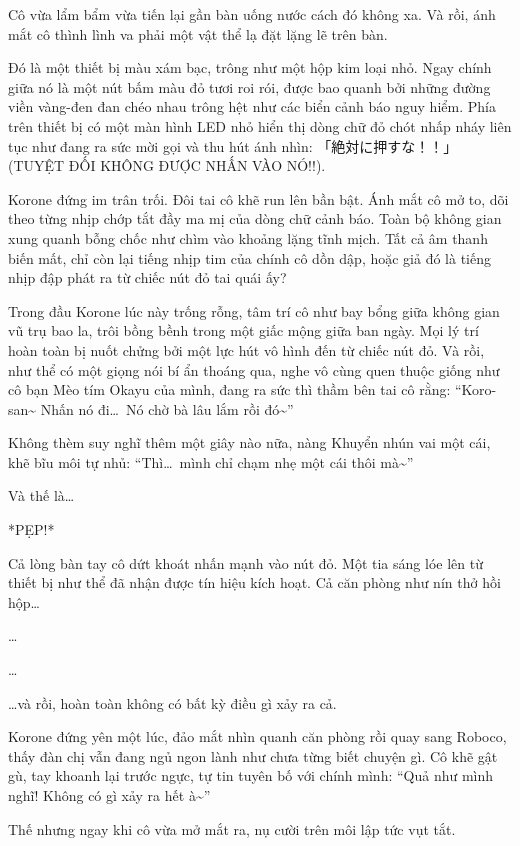 \documentclass[../main.tex]{subfiles}
\begin{document}
Cô vừa lẩm bẩm vừa tiến lại gần bàn uống nước cách đó không xa. Và rồi, ánh mắt cô thình lình va phải một vật thể lạ đặt lặng lẽ trên bàn.

Đó là một thiết bị màu xám bạc, trông như một hộp kim loại nhỏ. Ngay chính giữa nó là một nút bấm màu đỏ tươi roi rói, được bao quanh bởi những đường viền vàng-đen đan chéo nhau trông hệt như các biển cảnh báo nguy hiểm. Phía trên thiết bị có một màn hình LED nhỏ hiển thị dòng chữ đỏ chót nhấp nháy liên tục như đang ra sức mời gọi và thu hút ánh nhìn: 「絶対に押すな！！」 (TUYỆT ĐỐI KHÔNG ĐƯỢC NHẤN VÀO NÓ!!).


Korone đứng im trân trối. Đôi tai cô khẽ run lên bần bật. Ánh mắt cô mở to, dõi theo từng nhịp chớp tắt đầy ma mị của dòng chữ cảnh báo. Toàn bộ không gian xung quanh bỗng chốc như chìm vào khoảng lặng tĩnh mịch. Tất cả âm thanh biến mất, chỉ còn lại tiếng nhịp tim của chính cô dồn dập, hoặc giả đó là tiếng nhịp đập phát ra từ chiếc nút đỏ tai quái ấy?

Trong đầu Korone lúc này trống rỗng, tâm trí cô như bay bổng giữa không gian vũ trụ bao la, trôi bồng bềnh trong một giấc mộng giữa ban ngày. Mọi lý trí hoàn toàn bị nuốt chửng bởi một lực hút vô hình đến từ chiếc nút đỏ. Và rồi, như thể có một giọng nói bí ẩn thoáng qua, nghe vô cùng quen thuộc giống như cô bạn Mèo tím Okayu của mình, đang ra sức thì thầm bên tai cô rằng: ``Koro-san\~{} Nhấn nó đi\dots\ Nó chờ bà lâu lắm rồi đó\~{}''

Không thèm suy nghĩ thêm một giây nào nữa, nàng Khuyển nhún vai một cái, khẽ bĩu môi tự nhủ: ``Thì\dots\ mình chỉ chạm nhẹ một cái thôi mà\~{}''

Và thế là\dots

*PẸP!*

Cả lòng bàn tay cô dứt khoát nhấn mạnh vào nút đỏ. Một tia sáng lóe lên từ thiết bị như thể đã nhận được tín hiệu kích hoạt. Cả căn phòng như nín thở hồi hộp\dots

\dots

\dots

\dots và rồi, hoàn toàn không có bất kỳ điều gì xảy ra cả.

Korone đứng yên một lúc, đảo mắt nhìn quanh căn phòng rồi quay sang Roboco, thấy đàn chị vẫn đang ngủ ngon lành như chưa từng biết chuyện gì. Cô khẽ gật gù, tay khoanh lại trước ngực, tự tin tuyên bố với chính mình: ``Quả như mình nghĩ! Không có gì xảy ra hết à\~{}''

Thế nhưng ngay khi cô vừa mở mắt ra, nụ cười trên môi lập tức vụt tắt.
\end{document}
